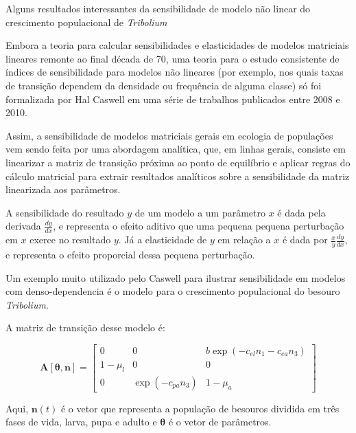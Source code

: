 \documentclass[12pt,a4paper]{article}
\begin{document}

\begin{center}
  {\Large Alguns resultados interessantes da sensibilidade de modelo
  n\~ao linear do crescimento populacional de {\em Tribolium}}

\end{center}

Embora a teoria para calcular sensibilidades e elasticidades de modelos matriciais
lineares remonte ao final d\'ecada de 70, uma teoria para o estudo consistente
de \'indices de sensibilidade para modelos n\~ao lineares (por exemplo, nos quais
taxas de transi\c c\~ao dependem da densidade ou frequ\^encia de alguma classe)
s\'o foi formalizada por Hal Caswell em uma s\'erie de trabalhos publicados entre 2008
e 2010.

Assim, a sensibilidade de modelos matriciais gerais em ecologia de popula\c c\~oes
vem sendo feita por uma abordagem anal\'itica, que, em linhas gerais, consiste em
linearizar a matriz de transi\c c\~ao pr\'oxima ao ponto de equil\'ibrio e aplicar
regras do c\'alculo matricial para extrair resultados anal\'iticos sobre a 
sensibilidade da matriz linearizada aos par\^ametros.

A sensibilidade do resultado $y$ de um modelo a um par\^ametro $x$ \'e dada pela derivada
$\frac{dy}{dx}$, e representa o efeito aditivo que uma pequena pequena perturba\c c\~ao 
em $x$ exerce no resultado $y$. J\'a a elasticidade de $y$ em rela\c c\~ao a $x$ \'e dada por
$\frac{x}{y}\frac{dy}{dx}$, e representa o efeito proporcial dessa pequena perturba\c c\~ao.

Um exemplo muito utilizado pelo Caswell para ilustrar sensibilidade em modelos com 
denso-dependencia \'e o modelo para o crescimento populacional do besouro {\em Tribolium}.

A matriz de transi\c c\~ao desse modelo \'e:

\begin{equation}
	\mathbf{A}[\mathbf{\theta},\mathbf{n}]  = \left[
		\begin{array} {ccccccc}
			0 &   0 &   b \exp(-c_{el}n_1-c_{ea}n_3) \\
			1 - \mu_l & 0 & 0 \\
			0 & \exp(-c_{pa}n_3) & 1-\mu_a 
		\end{array}
		\right]
		\label{LefMatrix}
\end{equation}

Aqui, $\mathbf{n}(t)$ \'e o vetor que representa a popula\c c\~ao de besouros dividida em
tr\^es fases de vida, larva, pupa e adulto e $\mathbf{\theta}$ \'e o vetor de par\^ametros.
\end{document}
